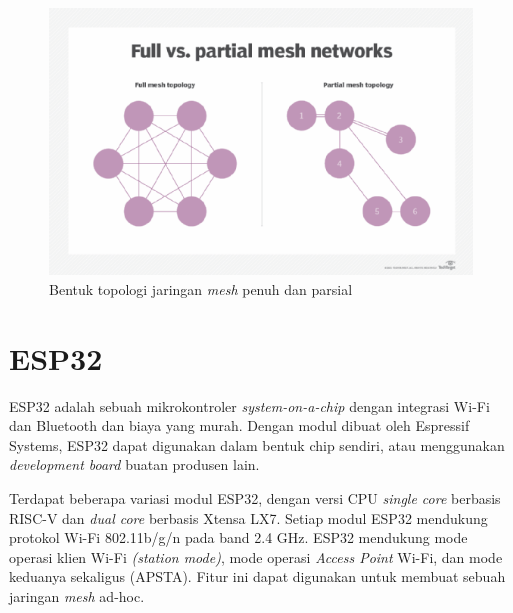 \begin{figure}[h]
	\centering
	\includegraphics[scale=0.5]{./assets/meshpartial}
	\caption{Bentuk topologi jaringan \textit{mesh} penuh dan parsial}
\end{figure}

\section{ESP32}
ESP32 adalah sebuah mikrokontroler \textit{system-on-a-chip} dengan integrasi Wi-Fi dan Bluetooth dan biaya yang murah. Dengan modul dibuat oleh Espressif Systems, ESP32 dapat digunakan dalam bentuk chip sendiri, atau menggunakan \textit{development board} buatan produsen lain.

Terdapat beberapa variasi modul ESP32, dengan versi CPU \textit{single core} berbasis RISC-V dan \textit{dual core} berbasis Xtensa LX7. Setiap modul ESP32 mendukung protokol Wi-Fi 802.11b/g/n pada band 2.4 GHz. ESP32 mendukung mode operasi klien Wi-Fi \textit{(station mode)}, mode operasi \textit{Access Point} Wi-Fi, dan mode keduanya sekaligus (APSTA). Fitur ini dapat digunakan untuk membuat sebuah jaringan \textit{mesh} ad-hoc.

